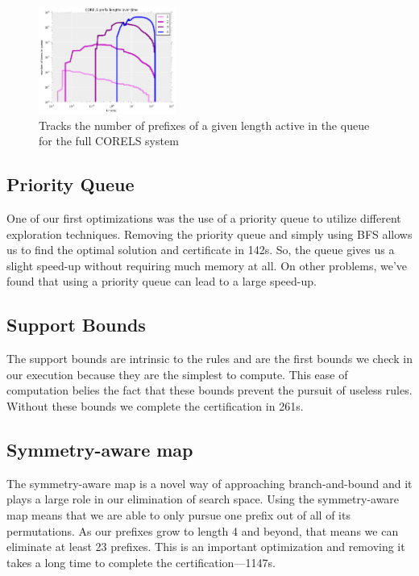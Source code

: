 \begin{figure}[t!]
\begin{center}
\includegraphics[width=0.4\textwidth]{figs/corels_prefixes.png}
\end{center}
\caption{Tracks the number of prefixes of a given length active in the queue for the full CORELS system}
\label{fig:corels-prefixes}
\end{figure}

\subsection{Priority Queue} \label{exp:priority}

One of our first optimizations was the use of a priority queue to utilize different exploration techniques. 
Removing the priority queue and simply using BFS allows us to find the optimal solution and certificate in 142s.
So, the queue gives us a slight speed-up without requiring much memory at all.
On other problems, we've found that using a priority queue can lead to a large speed-up.

\subsection{Support Bounds}

The support bounds are intrinsic to the rules and are the first bounds we check in our execution because they are the simplest to compute.
This ease of computation belies the fact that these bounds prevent the pursuit of useless rules.
Without these bounds we complete the certification in 261s.

\subsection{Symmetry-aware map}

The symmetry-aware map is a novel way of approaching branch-and-bound and it plays a large role in our elimination of search space.
Using the symmetry-aware map means that we are able to only pursue one prefix out of all of its permutations.
As our prefixes grow to length 4 and beyond, that means we can eliminate at least 23 prefixes.
This is an important optimization and removing it takes a long time to complete the certification---1147s.

